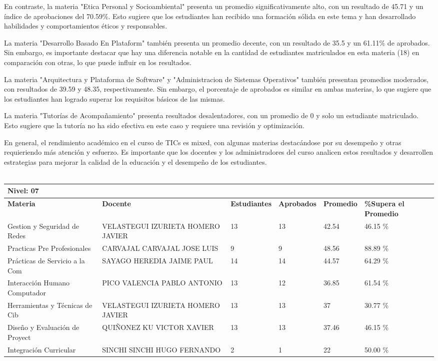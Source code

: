 En contraste, la materia "Etica Personal y Socioambiental" presenta un promedio significativamente alto, con un resultado de 45.71 y un índice de aprobaciones del 70.59\%. Esto sugiere que los estudiantes han recibido una formación sólida en este tema y han desarrollado habilidades y comportamientos éticos y responsables.

La materia "Desarrollo Basado En Plataform" también presenta un promedio decente, con un resultado de 35.5 y un 61.11\% de aprobados. Sin embargo, es importante destacar que hay una diferencia notable en la cantidad de estudiantes matriculados en esta materia (18) en comparación con otras, lo que puede influir en los resultados.

La materia "Arquitectura y Plataforma de Software" y "Administracion de Sistemas Operativos" también presentan promedios moderados, con resultados de 39.59 y 48.35, respectivamente. Sin embargo, el porcentaje de aprobados es similar en ambas materias, lo que sugiere que los estudiantes han logrado superar los requisitos básicos de las mismas.

La materia "Tutorías de Acompañamiento" presenta resultados desalentadores, con un promedio de 0 y solo un estudiante matriculado. Esto sugiere que la tutoría no ha sido efectiva en este caso y requiere una revisión y optimización.

En general, el rendimiento académico en el curso de TICs es mixed, con algunas materias destacándose por su desempeño y otras requieriendo más atención y esfuerzo. Es importante que los docentes y los administradores del curso analicen estos resultados y desarrollen estrategias para mejorar la calidad de la educación y el desempeño de los estudiantes.\\
\vspace{1cm}\\\small
\begin{tabularx}{\textwidth}{|p{2.5cm}|p{2.5cm}|X|X|X|X|}
\hline
\multicolumn{6}{|X|}{\textbf{Nivel: 07 }}\\\hline\textbf{Materia} & \textbf{Docente} & \textbf{Estudiantes} & \textbf{Aprobados} & \textbf{Promedio} & \textbf{\%Supera el Promedio} \\ \hline
Gestion y Seguridad de Redes & VELASTEGUI IZURIETA HOMERO JAVIER & 13 & 13 & 42.54 & 46.15 \%\\ \hline
Practicas Pre Profesionales & CARVAJAL CARVAJAL JOSE LUIS & 9 & 9 & 48.56 & 88.89 \%\\ \hline
Prácticas de Servicio a la Com & SAYAGO HEREDIA JAIME PAUL & 14 & 14 & 44.57 & 64.29 \%\\ \hline
Interacción Humano Computador & PICO VALENCIA PABLO ANTONIO & 13 & 12 & 36.85 & 61.54 \%\\ \hline
Herramientas y Técnicas de Cib & VELASTEGUI IZURIETA HOMERO JAVIER & 13 & 13 & 37 & 30.77 \%\\ \hline
Diseño y Evaluación de Proyect & QUIÑONEZ KU VICTOR XAVIER & 13 & 13 & 37.46 & 46.15 \%\\ \hline
Integración Curricular & SINCHI SINCHI HUGO FERNANDO & 2 & 1 & 22 & 50.00 \%\\ \hline
\end{tabularx}

